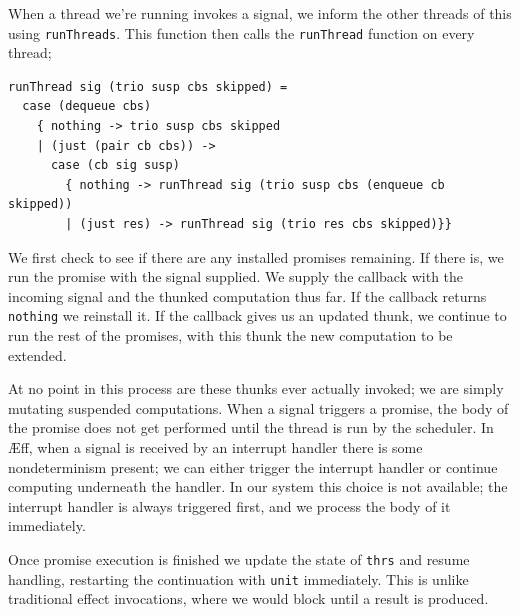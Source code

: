 \documentclass[msc,deptreport,cs]{infthesis} %
\newcommand{\code}[1]{\lstinline{#1}}
\newcommand\aeff{{\AE}ff\xspace}
\begin{document}
When a thread we're running invokes a signal, we inform the other threads of
this using \code{runThreads}. This function then calls the \code{runThread}
function on every thread;


\begin{lstlisting}
runThread sig (trio susp cbs skipped) =
  case (dequeue cbs)
    { nothing -> trio susp cbs skipped
    | (just (pair cb cbs)) ->
      case (cb sig susp)
        { nothing -> runThread sig (trio susp cbs (enqueue cb skipped))
        | (just res) -> runThread sig (trio res cbs skipped)}}
\end{lstlisting}

\noindent We first check to see if there are any installed promises remaining.
If there is, we run the promise with the signal supplied. We supply the callback
with the incoming signal and the thunked computation thus far. If the callback
returns \code{nothing} we reinstall it. If the callback gives us an updated
thunk, we continue to run the rest of the promises, with this thunk the new
computation to be extended.

At no point in this process are these thunks ever actually invoked; we are
simply mutating suspended computations. When a signal triggers a promise, the
body of the promise does not get performed until the thread is run by the
scheduler. In \aeff, when a signal is received by an interrupt handler there is
some nondeterminism present; we can either trigger the interrupt handler or
continue computing underneath the handler. In our system this choice is not
available; the interrupt handler is always triggered first, and we process the
body of it immediately.



Once promise execution is finished we update the state of \code{thrs} and resume
handling, restarting the continuation with \code{unit} immediately.
This is unlike traditional effect invocations, where we would block until a
result is produced.
\end{document}
